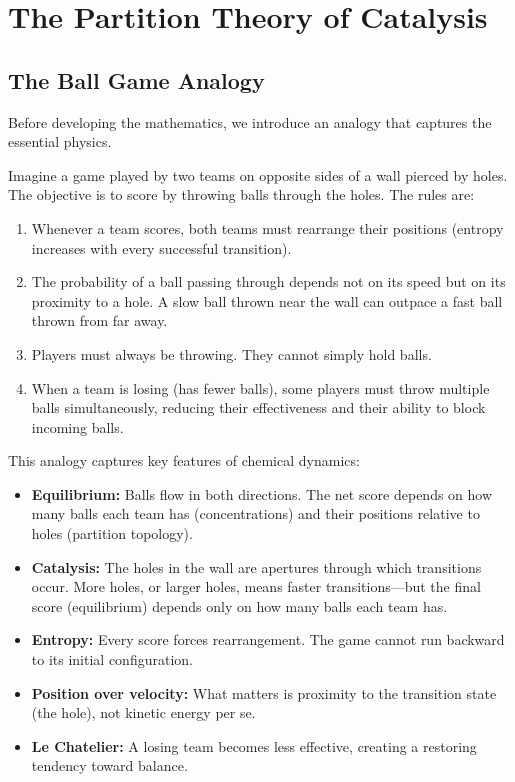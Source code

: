 ﻿\documentclass[twocolumn,10pt,a4paper]{article}
\theoremstyle{definition}
\theoremstyle{remark}
\begin{document}
\section{The Partition Theory of Catalysis}
\label{sec:catalysis}

\subsection{The Ball Game Analogy}

Before developing the mathematics, we introduce an analogy that captures the essential physics.

Imagine a game played by two teams on opposite sides of a wall pierced by holes. The objective is to score by throwing balls through the holes. The rules are:

\begin{enumerate}
    \item Whenever a team scores, both teams must rearrange their positions (entropy increases with every successful transition).

    \item The probability of a ball passing through depends not on its speed but on its proximity to a hole. A slow ball thrown near the wall can outpace a fast ball thrown from far away.

    \item Players must always be throwing. They cannot simply hold balls.

    \item When a team is losing (has fewer balls), some players must throw multiple balls simultaneously, reducing their effectiveness and their ability to block incoming balls.
\end{enumerate}

This analogy captures key features of chemical dynamics:

\begin{itemize}
    \item \textbf{Equilibrium:} Balls flow in both directions. The net score depends on how many balls each team has (concentrations) and their positions relative to holes (partition topology).

    \item \textbf{Catalysis:} The holes in the wall are apertures through which transitions occur. More holes, or larger holes, means faster transitions---but the final score (equilibrium) depends only on how many balls each team has.

    \item \textbf{Entropy:} Every score forces rearrangement. The game cannot run backward to its initial configuration.

    \item \textbf{Position over velocity:} What matters is proximity to the transition state (the hole), not kinetic energy per se.

    \item \textbf{Le Chatelier:} A losing team becomes less effective, creating a restoring tendency toward balance.
\end{itemize}
\end{document}
